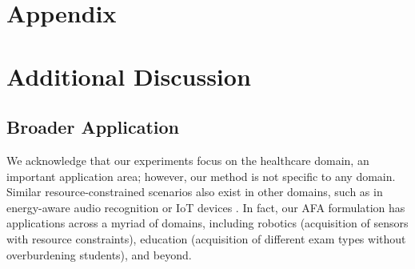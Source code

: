 


\newpage
\appendix
\onecolumn
\section*{Appendix}
\section{Additional Discussion} \label{appendex:discussion}

\subsection{Broader Application}
\label{appendex: impact}
We acknowledge that our experiments focus on the healthcare domain, an important application area; however, our method is not specific to any domain. Similar resource-constrained scenarios also exist in other domains, such as in energy-aware audio recognition \citep{monjur2023soundsieve} or IoT devices \citep{dunkels2011powertrace}. In fact, our AFA formulation has applications across a myriad of domains, including robotics (acquisition of sensors with resource constraints), education (acquisition of different exam types without overburdening students), and beyond.

